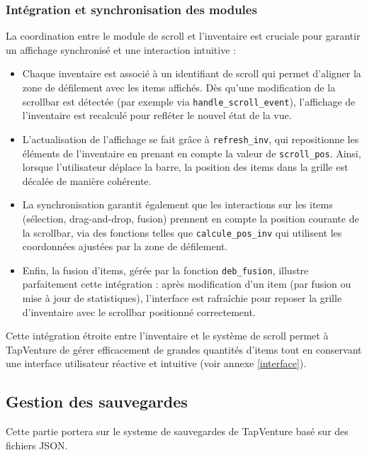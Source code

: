 \documentclass[11pt,a4paper]{article}
\begin{document}
\subsubsection{Intégration et synchronisation des modules}
La coordination entre le module de scroll et l'inventaire est cruciale pour garantir un affichage synchronisé et une interaction intuitive :
\begin{itemize}
    \item Chaque inventaire est associé à un identifiant de scroll qui permet d'aligner la zone de défilement avec les items affichés. Dès qu'une modification de la scrollbar est détectée (par exemple via \texttt{handle\_scroll\_event}), l'affichage de l'inventaire est recalculé pour refléter le nouvel état de la vue.
    \item L'actualisation de l'affichage se fait grâce à \texttt{refresh\_inv}, qui repositionne les éléments de l'inventaire en prenant en compte la valeur de \texttt{scroll\_pos}. Ainsi, lorsque l'utilisateur déplace la barre, la position des items dans la grille est décalée de manière cohérente.
    \item La synchronisation garantit également que les interactions sur les items (sélection, drag-and-drop, fusion) prennent en compte la position courante de la scrollbar, via des fonctions telles que \texttt{calcule\_pos\_inv} qui utilisent les coordonnées ajustées par la zone de défilement.
    \item Enfin, la fusion d'items, gérée par la fonction \texttt{deb\_fusion}, illustre parfaitement cette intégration : après modification d'un item (par fusion ou mise à jour de statistiques), l'interface est rafraîchie pour reposer la grille d'inventaire avec le scrollbar positionné correctement.
\end{itemize}
Cette intégration étroite entre l'inventaire et le système de scroll permet à TapVenture de gérer efficacement de grandes quantités d'items tout en conservant une interface utilisateur réactive et intuitive (voir annexe \ref{interface}).

\subsection{Gestion des sauvegardes}
Cette partie portera sur le systeme de sauvegardes de TapVenture basé sur des fichiers JSON.
\end{document}

